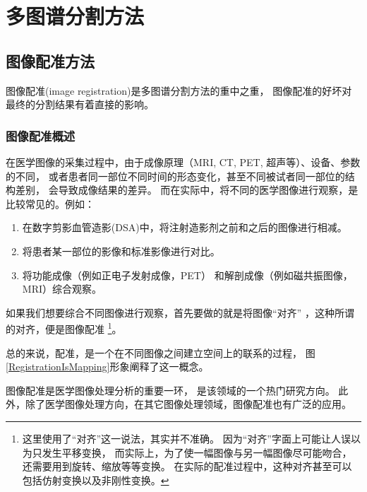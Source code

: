 
\chapter{多图谱分割方法}

\section{图像配准方法}
  图像配准(image registration)是多图谱分割方法的重中之重，
  图像配准的好坏对最终的分割结果有着直接的影响。
\subsection{图像配准概述}
在医学图像的采集过程中，由于成像原理（MRI, CT, PET, 超声等）、设备、参数的不同，
或者患者同一部位不同时间的形态变化，甚至不同被试者同一部位的结构差别，
会导致成像结果的差异。
而在实际中，将不同的医学图像进行观察，是比较常见的。例如：
\begin{enumerate}
  \item 在数字剪影血管造影(DSA)中，将注射造影剂之前和之后的图像进行相减。
  \item 将患者某一部位的影像和标准影像进行对比。
  \item 将功能成像（例如正电子发射成像，PET）%
    和解剖成像（例如磁共振图像，MRI）综合观察。
\end{enumerate}
如果我们想要综合不同图像进行观察，首先要做的就是将图像``对齐''
，这种所谓的对齐，便是图像配准
\footnote{这里使用了``对齐''这一说法，其实并不准确。
因为``对齐''字面上可能让人误以为只发生平移变换，
而实际上，为了使一幅图像与另一幅图像尽可能吻合，
还需要用到旋转、缩放等等变换。
在实际的配准过程中，这种对齐甚至可以包括仿射变换以及非刚性变换。}。

总的来说，配准，是一个在不同图像之间建立空间上的联系的过程，
图\ref{RegistrationIsMapping}形象阐释了这一概念。

图像配准是医学图像处理分析的重要一环，
是该领域的一个热门研究方向。
此外，除了医学图像处理方向，在其它图像处理领域，图像配准也有广泛的应用。


